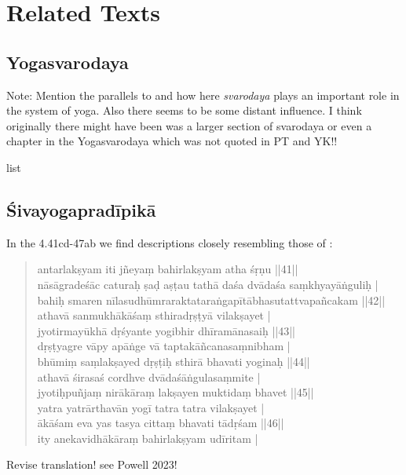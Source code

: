 \chapter{Related Texts}

\section{Yogasvarodaya}

Note: Mention the parallels to  and how here \textit{svarodaya} plays an important role in the system of yoga. Also there seems to be some distant influence. I think originally there might have been was a larger section of svarodaya or even a chapter in the Yogasvarodaya which was not quoted in PT and YK!!


list 

\section{Śivayogapradīpikā}
In the  4.41cd-47ab we find descriptions closely resembling those of :
\begin{quote}
antarlakṣyam iti jñeyaṃ bahirlakṣyam atha śṛṇu ||41||\\
nāsāgradeśāc caturaḥ ṣaḍ aṣṭau tathā daśa dvādaśa saṃkhyayāṅguliḥ |\\
bahiḥ smaren nīlasudhūmraraktataraṅgapītābhasutattvapañcakam ||42||\\
athavā sanmukhākāśaṃ sthiradṛṣṭyā vilakṣayet |\\
jyotirmayūkhā dṛśyante yogibhir dhīramānasaiḥ ||43||\\
dṛṣṭyagre vāpy apāṅge vā taptakāñcanasaṃnibham | \\
bhūmiṃ saṃlakṣayed dṛṣṭiḥ sthirā bhavati yoginaḥ ||44||\\
athavā śirasaś cordhve dvādaśāṅgulasaṃmite |\\
jyotiḥpuñjaṃ nirākāraṃ lakṣayen muktidaṃ bhavet ||45||\\
yatra yatrārthavān yogī tatra tatra vilakṣayet |\\
ākāśam eva yas tasya cittaṃ bhavati tādṛśam ||46||\\
ity anekavidhākāraṃ bahirlakṣyam udīritam |\\
\end{quote}

Revise translation! see Powell 2023! 


